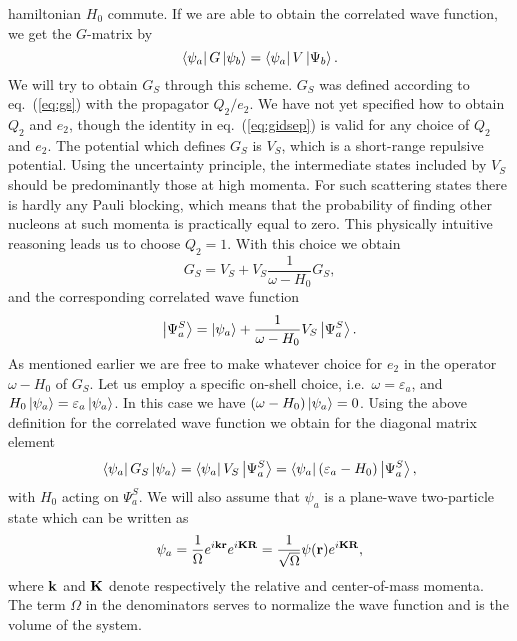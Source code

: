 hamiltonian $H_0$ commute. If we are able to obtain the correlated 
wave function, we get the $G$-matrix by
\begin{equation}
   \left\langle \psi_a \right|G\left| \psi_b \right\rangle=\left\langle \psi_a \right|V\left| \Psi_b \right\rangle.
\end{equation}
We will try to obtain $G_S$ through this scheme. $G_S$ was defined
according to eq.\ (\ref{eq:gs}) with the propagator $Q_2/e_2$.
We have not yet specified how to obtain $Q_2$ and $e_2$, though
the identity
in eq.\ (\ref{eq:gidsep}) is valid  for any choice of $Q_2$ and $e_2$. 
The potential which defines $G_S$ is $V_S$, which is a short-range 
repulsive potential. Using the uncertainty principle, the intermediate
states included by $V_S$ should be predominantly those at high momenta.
For such scattering states there is hardly any Pauli blocking, which 
means that the probability of finding other nucleons at such momenta
is practically equal to zero. This physically intuitive reasoning
leads us to choose $Q_2=1$. With this choice we obtain
\begin{equation}
    G_S=V_S+V_S\frac{1}{\omega -H_0}G_S,
\end{equation}
and the corresponding correlated wave function
\begin{equation}
    \left| \Psi_a^S \right\rangle=
    \left| \psi_a \right\rangle+\frac{1}{\omega - H_0}V_S\left| \Psi_a^S \right\rangle.
\end{equation}
As mentioned earlier we are free to make whatever choice for $e_2$
in the operator $\omega -H_0$ of $G_S$. Let us employ a specific
on-shell choice, i.e.\ $\omega =\varepsilon_a$, and $H_0\left| \psi_a \right\rangle
=\varepsilon_a\left| \psi_a \right\rangle$. In this case we have
$(\omega -H_0)\left| \psi_a \right\rangle=0$. Using the above definition
for the correlated wave function we obtain for the diagonal
matrix element
\begin{equation}
     \left\langle \psi_a \right|G_S\left| \psi_a \right\rangle=\left\langle \psi_a \right|V_S\left| \Psi_a^S \right\rangle
     =\left\langle \psi_a \right|(\varepsilon_a -H_0)\left| \Psi_a^S \right\rangle,
     \label{eq:eq22}
\end{equation}
with $H_0$ acting on $\Psi_a^S$.
We will also assume that $\psi_a$ is a plane-wave two-particle
state which can be written as
\begin{equation}
    \psi_a=\frac{1}{\Omega}e^{i{\bf kr}}e^{i{\bf KR}}
    = \frac{1}{\sqrt{\Omega}}\psi ({\bf r})e^{i{\bf KR}},
\end{equation}
where ${\bf k}$ and ${\bf K}$ denote respectively the relative and
center-of-mass
momenta. The term $\Omega$ in the denominators
serves to normalize the wave function and is the volume of the system.
